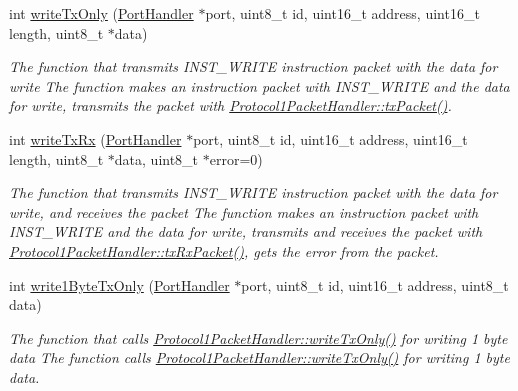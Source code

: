 \begin{DoxyCompactItemize}
int \hyperlink{classmercury_1_1_protocol1_packet_handler_a4dac18c7624bef8723b1e96889bce665}{write\+Tx\+Only} (\hyperlink{classmercury_1_1_port_handler}{Port\+Handler} $\ast$port, uint8\+\_\+t id, uint16\+\_\+t address, uint16\+\_\+t length, uint8\+\_\+t $\ast$data)
\begin{DoxyCompactList}\small\item\em The function that transmits I\+N\+S\+T\+\_\+\+W\+R\+I\+TE instruction packet with the data for write  The function makes an instruction packet with I\+N\+S\+T\+\_\+\+W\+R\+I\+TE and the data for write,  transmits the packet with \hyperlink{classmercury_1_1_protocol1_packet_handler_a232c9159fef54e7aaf38859fcce5a322}{Protocol1\+Packet\+Handler\+::tx\+Packet()}. \end{DoxyCompactList}\item 
int \hyperlink{classmercury_1_1_protocol1_packet_handler_abbeadd6883c895cb8f9f9497c27d8a94}{write\+Tx\+Rx} (\hyperlink{classmercury_1_1_port_handler}{Port\+Handler} $\ast$port, uint8\+\_\+t id, uint16\+\_\+t address, uint16\+\_\+t length, uint8\+\_\+t $\ast$data, uint8\+\_\+t $\ast$error=0)
\begin{DoxyCompactList}\small\item\em The function that transmits I\+N\+S\+T\+\_\+\+W\+R\+I\+TE instruction packet with the data for write, and receives the packet  The function makes an instruction packet with I\+N\+S\+T\+\_\+\+W\+R\+I\+TE and the data for write,  transmits and receives the packet with \hyperlink{classmercury_1_1_protocol1_packet_handler_ae488c4554064d6dd0ccabb9d2410e8f0}{Protocol1\+Packet\+Handler\+::tx\+Rx\+Packet()},  gets the error from the packet. \end{DoxyCompactList}\item 
int \hyperlink{classmercury_1_1_protocol1_packet_handler_af6b6da7a42ac93a0be824fc1757daa4b}{write1\+Byte\+Tx\+Only} (\hyperlink{classmercury_1_1_port_handler}{Port\+Handler} $\ast$port, uint8\+\_\+t id, uint16\+\_\+t address, uint8\+\_\+t data)
\begin{DoxyCompactList}\small\item\em The function that calls \hyperlink{classmercury_1_1_protocol1_packet_handler_a4dac18c7624bef8723b1e96889bce665}{Protocol1\+Packet\+Handler\+::write\+Tx\+Only()} for writing 1 byte data  The function calls \hyperlink{classmercury_1_1_protocol1_packet_handler_a4dac18c7624bef8723b1e96889bce665}{Protocol1\+Packet\+Handler\+::write\+Tx\+Only()} for writing 1 byte data. \end{DoxyCompactList}\item 

\end{DoxyCompactItemize}
